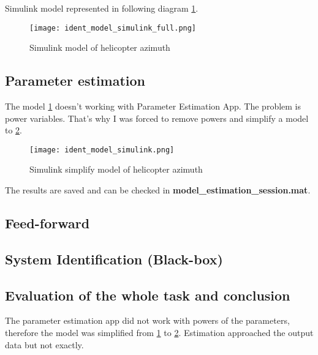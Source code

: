 \documentclass[../report.tex]{subfiles}
\begin{document}
Simulink model represented in following diagram
\ref{fig:ident_model_simulink_full}.
\begin{figure}[htb!]
    \centering
    \texttt{[image: ident\_model\_simulink\_full.png]}
    \caption{Simulink model of helicopter azimuth}
    \label{fig:ident_model_simulink_full}
\end{figure}

\subsection{Parameter estimation}

The model \ref{fig:ident_model_simulink_full} doesn't working with
Parameter Estimation App. The problem is power variables. That's why I was
forced to remove powers and simplify a model to
\ref{fig:ident_model_simulink}.
\begin{figure}[htb!]
    \centering
    \texttt{[image: ident\_model\_simulink.png]}
    \caption{Simulink simplify model of helicopter azimuth}
    \label{fig:ident_model_simulink}
\end{figure}

The results are saved and can be checked in \textbf{model\_estimation\_session.mat}.

\subsection{Feed-forward}
\subsection{System Identification (Black-box)}
\subsection{Evaluation of the whole task and conclusion}
The parameter estimation app did not work with powers of the parameters,
therefore the model was simplified from \ref{fig:ident_model_simulink_full} to
\ref{fig:ident_model_simulink}. Estimation approached the output
data but not exactly. 
\end{document}
